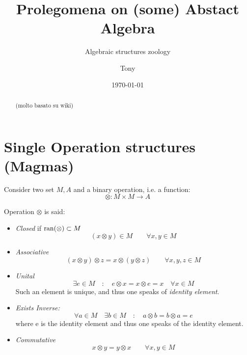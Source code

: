 \documentclass[a4paper,12pt]{scrartcl}    %
\newcommand{\OpA}{\otimes}
\begin{document}
	\title{Prolegomena on (some) Abstact Algebra}
	\subtitle{Algebraic structures zoology}
	\author{Tony}
	\date{\today}
\maketitle

\begin{abstract}
	(molto basato su wiki)

\end{abstract}

\tableofcontents

\newpage

\section{Single Operation structures (Magmas)}
Consider two set $M, A$ and a binary operation, i.e. a function:
\begin{displaymath}
	\OpA : M \times M \rightarrow A
\end{displaymath}

Operation $\OpA$ is said:
\begin{itemize}
\item \emph{Closed} if $\ran(\OpA)\subset M$
	\begin{equation}\label{Closure}
		( x \OpA y ) \in M \qquad \forall x,y\in M
	\end{equation}
\item \emph{Associative}
	\begin{equation}\label{Associativity}
		(x \OpA y) \OpA z = x \OpA (y \OpA z) \qquad \forall x,y,z \in M
	\end{equation}
\item \emph{Unital}
	\begin{equation}\label{ExistsUnit}
		\exists e \in M \quad : \quad e \OpA x = x \OpA e = x \quad \forall x \in M
	\end{equation}
	Such an element is unique, and thus one speaks of \emph{identity element}.
\item \emph{Exists Inverse:}
	\begin{equation}\label{ExistsInverse}
		\forall a \in M \quad \exists b \in M \quad : \quad a \OpA b = b \OpA a = e
	\end{equation}
	where e is the identity element and thus one speaks of the identity element.
\item \emph{Commutative}
	\begin{equation}\label{Commutativity}
		x \OpA y = y \OpA x \qquad \forall x,y\in M
	\end{equation}
\end{itemize}
\end{document}
